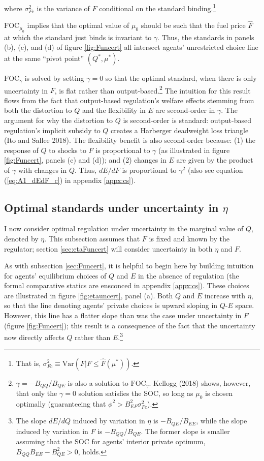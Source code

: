 \documentclass[12pt]{article}
\begin{document}
where $\sigma_{Fc}^2$ is the variance of $F$ conditional on the standard binding.\footnote{That is, $\sigma_{Fc}^2\equiv \text{Var}(F|F\leq\hat{F}(\mu^*))$.}

$\text{FOC}_{\mu_0}$ implies that the optimal value of $\mu_0$ should be such that the fuel price $\hat{F}$ at which the standard just binds is invariant to $\gamma$. Thus, the standards in panels (b), (c), and (d) of figure \ref{fig:Funcert} all intersect agents' unrestricted choice line at the same ``pivot point'' $(Q^*,\mu^*)$.

$\text{FOC}_{\gamma}$ is solved by setting $\gamma=0$ so that the optimal standard, when there is only uncertainty in $F$, is flat rather than output-based.\footnote{$\gamma=-B_{QQ}/B_{QE}$ is also a solution to $\text{FOC}_{\gamma}$. Kellogg (2018) shows, however, that only the $\gamma=0$ solution satisfies the SOC, so long as $\mu_0$ is chosen optimally (guaranteeing that $\phi^2>B_{EF}^2\sigma_{Fc}^2$).} The intuition for this result flows from the fact that output-based regulation's welfare effects stemming from both the distortion to $Q$ and the flexibility in $E$ are second-order in $\gamma$. The argument for why the distortion to $Q$ is second-order is standard: output-based regulation's implicit subsidy to $Q$ creates a Harberger deadweight loss triangle (Ito and Sallee 2018). The flexibility benefit is also second-order because: (1) the response of $Q$ to shocks to $F$ is proportional to $\gamma$ (as illustrated in figure \ref{fig:Funcert}, panels (c) and (d)); and (2) changes in $E$ are given by the product of $\gamma$ with changes in $Q$. Thus, $dE/dF$ is proportional to $\gamma^2$ (also see equation (\ref{eq:A1_dEdF_c}) in appendix \ref{appx:cs}).


\subsection{Optimal standards under uncertainty in $\eta$} \label{sec:etauncert}

I now consider optimal regulation under uncertainty in the marginal value of $Q$, denoted by $\eta$. This subsection assumes that $F$ is fixed and known by the regulator; section \ref{sec:etaFuncert} will consider uncertainty in both $\eta$ and $F$. 

As with subsection \ref{sec:Funcert}, it is helpful to begin here by building intuition for agents' equilibrium choices of $Q$ and $E$ in the absence of regulation (the formal comparative statics are ensconced in appendix \ref{appx:cs}). These choices are illustrated in figure \ref{fig:etauncert}, panel (a). Both $Q$ and $E$ increase with $\eta$, so that the line denoting agents' private choices is upward sloping in $Q$-$E$ space. However, this line has a flatter slope than was the case under uncertainty in $F$ (figure \ref{fig:Funcert}); this result is a consequence of the fact that the uncertainty now directly affects $Q$ rather than $E$.\footnote{The slope $dE/dQ$ induced by variation in $\eta$ is $-B_{QE}/B_{EE}$, while the slope induced by variation in $F$ is $-B_{QQ}/B_{QE}$. The former slope is smaller assuming that the SOC for agents' interior private optimum, $B_{QQ}B_{EE}-B_{QE}^2>0$, holds.}
\end{document}
